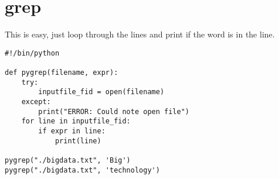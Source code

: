 \documentclass[11pt]{article}
\begin{document}
\section{grep}
\label{sec:org95b840b}

This is easy, just loop through the lines and print if the word is in the line.

\begin{verbatim}
#!/bin/python

def pygrep(filename, expr):
    try:
        inputfile_fid = open(filename)
    except:
        print("ERROR: Could note open file")
    for line in inputfile_fid:
        if expr in line:
            print(line)

pygrep("./bigdata.txt", 'Big')
pygrep("./bigdata.txt", 'technology')
\end{verbatim}
\end{document}
